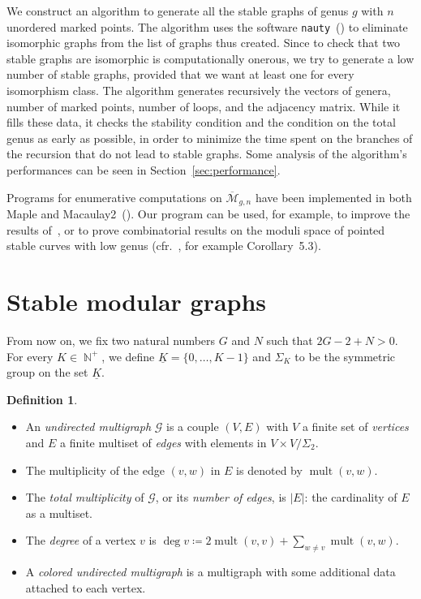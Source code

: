 \documentclass{amsart}
\theoremstyle{plain}
\theoremstyle{definition}
\newtheorem{definition}[theorem]{Definition}
\DeclareMathOperator{\bN}{\mathbb{N}}
\DeclareMathOperator{\mult}{mult}
\newcommand{\graph}{\mathcal{G}}
\newcommand{\abs}[1]{\left|#1\right|}
\newcommand{\ubar}[1]{\underline{#1}}
\begin{document}
We construct an algorithm to generate all the stable graphs of genus
$g$ with $n$ unordered marked points. The algorithm uses the software
\texttt{nauty}~(\cite{nauty}) to eliminate isomorphic graphs from the
list of graphs thus created. Since to check that two stable graphs are
isomorphic is computationally onerous, we try to generate a low number
of stable graphs, provided that we want at least one for every
isomorphism class. The algorithm generates recursively the vectors of
genera, number of marked points, number of loops, and the adjacency
matrix. While it fills these data, it checks the stability condition
and the condition on the total genus as early as possible, in order to
minimize the time spent on the branches of the recursion that do not
lead to stable graphs. Some analysis of the algorithm's performances
can be seen in Section~\ref{sec:performance}.

Programs for enumerative computations on
$\overline{\mathcal{M}}_{g,n}$ have been implemented in both Maple and
Macaulay2~(\cite{faber,stephanie1,smith}). Our program can be used,
for example, to improve the results of~\cite[Section 5]{stephanie2},
or to prove combinatorial results on the moduli space of pointed
stable curves with low genus (cfr.~\cite{busonero}, for example
Corollary~5.3).



\section{Stable modular graphs}

From now on, we fix two natural numbers $G$ and $N$ such that $2
G-2+N>0$.  For every $K \in \bN^+$, we define $\ubar{K} = \{0, \dots,
K-1\}$ and $\Sigma_K$ to be the symmetric group on the set $\ubar{K}$.

\begin{definition}
  \mbox{}
  \begin{itemize}
  \item An \emph{undirected multigraph\/} $\graph$ is a couple $(V,
    E)$ with $V$ a finite set of \emph{vertices\/} and $E$ a finite
    multiset of \emph{edges\/} with elements in $V \times V/\Sigma_2$.
  \item The multiplicity of the edge $(v, w)$ in $E$ is denoted by
    $\mult(v, w)$.
  \item The \emph{total multiplicity\/} of $\graph$, or its
    \emph{number of edges}, is $\abs{E}$: the cardinality of $E$ as a
    multiset.
  \item The \emph{degree\/} of a vertex $v$ is $\deg v \coloneqq 2
    \mult(v, v) + \sum_{w \neq v} \mult(v, w)$.
  \item A \emph{colored undirected multigraph\/} is a multigraph with
    some additional data attached to each vertex.
  \end{itemize}
\end{definition}
\end{document}
